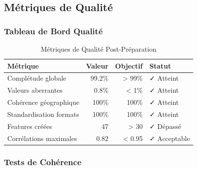 \subsection{Métriques de Qualité}
\label{subsec:metriques_qualite}

\subsubsection{Tableau de Bord Qualité}

\begin{table}[H]
\centering
\caption{Métriques de Qualité Post-Préparation}
\begin{tabular}{|l|r|r|l|}
\hline
\textbf{Métrique} & \textbf{Valeur} & \textbf{Objectif} & \textbf{Statut} \\
\hline
Complétude globale & 99.2\% & > 99\% & ✓ Atteint \\
\hline
Valeurs aberrantes & 0.8\% & < 1\% & ✓ Atteint \\
\hline
Cohérence géographique & 100\% & 100\% & ✓ Atteint \\
\hline
Standardisation formats & 100\% & 100\% & ✓ Atteint \\
\hline
Features créées & 47 & > 30 & ✓ Dépassé \\
\hline
Corrélations maximales & 0.82 & < 0.95 & ✓ Acceptable \\
\hline
\end{tabular}
\label{tab:metriques_qualite}
\end{table}

\subsubsection{Tests de Cohérence}

